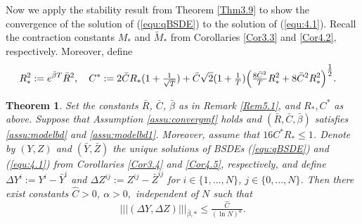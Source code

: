 \documentclass[10pt,a4paper]{article}
\newcommand{\be}{\begin{equation}}
\newcommand{\ee}{\end{equation}}
\newcommand{\bC}{\bar{C}}
\newcommand{\bR}{\bar{R}}
\newcommand{\hC}{\hat{C}}
\theoremstyle{plain}
\newtheorem{Theorem}{Theorem}[section]
\theoremstyle{definition}
\numberwithin{equation}{section}
\newcommand{\trinm}[1]{\vert\!\vert\!\vert #1 \vert\!\vert\!\vert}
\begin{document}
    
Now we apply the stability result from Theorem \ref{Thm3.9} to show the convergence of the solution of (\ref{equ:qBSDE}) to the solution of (\ref{equ:4.1}). Recall the contraction constants $M_{*}$ and $\tilde{M}_{*}$ from Corollaries \ref{Cor3.3} and \ref{Cor4.2}, respectively. Moreover, define
\begin{align}
R_{*}^{2} &:= e^{\bar{\beta} T} \bR^{2}, \  \ \ 
C^{*} := 2\bC R_{*}(1+\tfrac{1}{\sqrt{T}}) + \bC \sqrt{2}(1+\tfrac{1}{T})\Bigl(\tfrac{8 \bC^{2}}{T}R_{*}^{2} + 8 \bC^{2}R_{*}^{2}\Bigr)^{\tfrac{1}{2}}. \nonumber
\end{align}
\begin{Theorem}
\label{Thm5.3}
Set the constants $\bR$, $\bC$, $\bar{\beta}$ as in Remark \ref{Rem5.1}, and $R_{*} , C^{*}$ as above. Suppose that Assumption \ref{assu:convergmf} holds and $(\bR, \bC, \bar{\beta})$ satisfies \eqref{assu:modelbd} and \eqref{assu:modelbd1}. Moreover, assume that $16C^{*}R_{*} \leq 1$.
Denote by $(Y,Z)$ and $(\bar{Y},\bar{Z})$ the unique solutions of BSDEs \textnormal{(\ref{equ:qBSDE})} and \textnormal{(\ref{equ:4.1})} from Corollaries \ref{Cor3.4} and \ref{Cor4.5}, respectively, and define $\Delta Y^{i} := Y^{i}-\bar{Y}^{i}$ and $\Delta Z^{ij} := Z^{ij} - \bar{Z}^{ij}$ for $i \in \{1,...,N\}$, $j \in \{0,...,N\}$. Then there exist constants $\hC >0$, $\alpha>0,$ independent of $N$ such that
\be
\trinm{(\Delta Y,\Delta Z)}_{\bar{\beta},*} \leq \tfrac{\hC}{(\ln{N})^{\alpha}}.
\ee
\end{Theorem}
\end{document}
